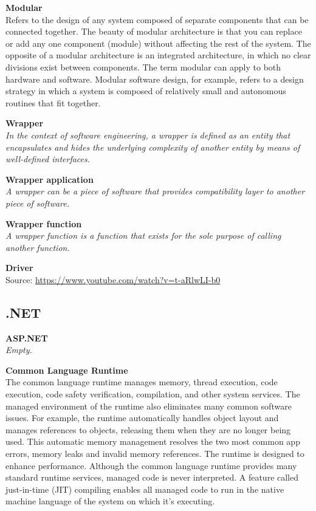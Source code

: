 \textbf{Modular} \\
Refers to the design of any system composed of separate components that can be connected together. The beauty of modular architecture is that you can replace or add any one component (module) without affecting the rest of the system. The opposite of a modular architecture is an integrated architecture, in which no clear divisions exist between components. The term modular can apply to both hardware and software. Modular software design, for example, refers to a design strategy in which a system is composed of relatively small and autonomous routines that fit together. 

\textbf{Wrapper} \\
\textit{In the context of software engineering, a wrapper is defined as an entity that encapsulates and hides the underlying complexity of another entity by means of well-defined interfaces.}


\textbf{Wrapper application} \\
\textit{A wrapper can be a piece of software that provides compatibility layer to another piece of software.}

\textbf{Wrapper function} \\
\textit{A wrapper function is a function that exists for the sole purpose of calling another function.}


\textbf{Driver} \\
Source: \url{https://www.youtube.com/watch?v=t-aRlwLI-b0}

\clearpage
\subsection{.NET}

\textbf{ASP.NET} \\
\textit{Empty.}


\textbf{Common Language Runtime \cite{software:CLR}} \\
The common language runtime manages memory, thread execution, code execution, code safety verification, compilation, and other system services. 
The managed environment of the runtime also eliminates many common software issues. For example, the runtime automatically handles object layout and manages references to objects, releasing them when they are no longer being used. This automatic memory management resolves the two most common app errors, memory leaks and invalid memory references.
The runtime is designed to enhance performance. Although the common language runtime provides many standard runtime services, managed code is never interpreted. A feature called just-in-time (JIT) compiling enables all managed code to run in the native machine language of the system on which it's executing.

